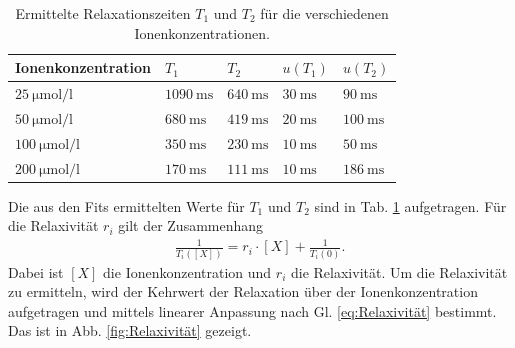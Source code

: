 \documentclass[../main.tex]{subfiles}
\begin{document}
    \begin{table}[h!]
        \centering
        \begin{tabular}{l|llll}
        Ionenkonzentration                  & $T_{1}$                     & $T_{2}$                    & $u(T_{1})$                & $u(T_{2})$                 \\ \hline
        $\SI{25}{\micro \mol \per \litre}$  & $\SI{1090}{\milli \second}$ & $\SI{640}{\milli \second}$  & $\SI{30}{\milli \second}$ & $\SI{90}{\milli \second}$  \\
        $\SI{50}{\micro \mol \per \litre}$  & $\SI{680}{\milli \second}$  & $\SI{419}{\milli \second}$ & $\SI{20}{\milli \second}$ & $\SI{100}{\milli \second}$ \\
        $\SI{100}{\micro \mol \per \litre}$ & $\SI{350}{\milli \second}$  & $\SI{230}{\milli \second}$ & $\SI{10}{\milli \second}$ & $\SI{50}{\milli \second}$  \\
        $\SI{200}{\micro \mol \per \litre}$ & $\SI{170}{\milli \second}$  & $\SI{111}{\milli \second}$ & $\SI{10}{\milli \second}$ & $\SI{186}{\milli \second}$
        \end{tabular}
        \caption{Ermittelte Relaxationszeiten $T_{1}$ und $T_{2}$ für die verschiedenen Ionenkonzentrationen.}
        \label{tab:RelaxT}
    \end{table}
    Die aus den Fits ermittelten Werte für $T_{1}$ und $T_{2}$ sind in Tab. \ref{tab:RelaxT} aufgetragen. Für die Relaxivität $r_{i}$ gilt der Zusammenhang
    \begin{align} \label{eq:Relaxivität}
        \frac{1}{T_{i}([X])} = r_{i} \cdot [X] + \frac{1}{T_{i}(0)}.
    \end{align}
    Dabei ist $[X]$ die Ionenkonzentration und $r_{i}$ die Relaxivität. Um die Relaxivität zu ermitteln, wird der Kehrwert der Relaxation über der Ionenkonzentration aufgetragen und mittels linearer Anpassung nach Gl. \ref{eq:Relaxivität} bestimmt. Das ist in Abb. \ref{fig:Relaxivität} gezeigt.
\end{document}
